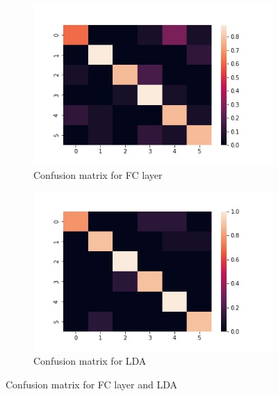 \documentclass[11pt]{article}
\begin{document}
\begin{figure}[h!]
  \centering
  \begin{subfigure}[b]{0.4\linewidth}
    \includegraphics[width=\linewidth]{fedStanford901lr005_2x3others.jpg}
    \caption{Confusion matrix for FC layer}
  \end{subfigure}
  \begin{subfigure}[b]{0.4\linewidth}
    \includegraphics[width=\linewidth]{fedStanford901DA.jpg}
    \caption{Confusion matrix for LDA}
  \end{subfigure}
  \caption{Confusion matrix for FC layer and LDA}
  \label{fig:9FCLDA}
\end{figure}
\end{document}

